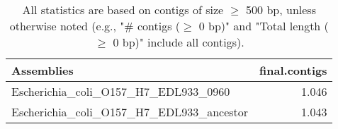 \documentclass[12pt,a4paper]{article}
\begin{document}
\begin{table}[ht]
\begin{center}
\caption{All statistics are based on contigs of size $\geq$ 500 bp, unless otherwise noted (e.g., "\# contigs ($\geq$ 0 bp)" and "Total length ($\geq$ 0 bp)" include all contigs).}
\begin{tabular}{|l*{1}{|r}|}
\hline
Assemblies & final.contigs \\ \hline
Escherichia\_coli\_O157\_H7\_EDL933\_0960 & 1.046 \\ \hline
Escherichia\_coli\_O157\_H7\_EDL933\_ancestor & 1.043 \\ \hline
\end{tabular}
\end{center}
\end{table}
\end{document}
